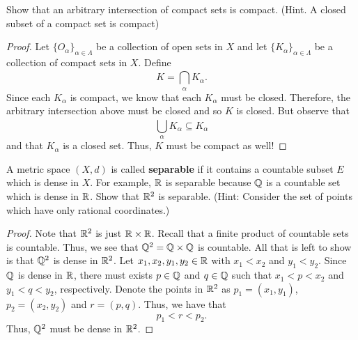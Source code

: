 \documentclass[a4paper]{article}
\begin{document}
   \begin{problem}
       Show that an arbitrary intersection of compact sets is compact. (Hint. A closed subset of a compact set is compact)
   \end{problem}
   \begin{proof}
       Let \( \{ {O}_{\alpha} \}_{\alpha \in \Lambda} \) be a collection of open sets in \( X  \) and let \( \{ {K}_{\alpha} \}_{\alpha \in \Lambda} \) be a collection of compact sets in \( X  \). Define
       \[  K = \bigcap_{  \alpha  }^{  } {K}_{\alpha}. \tag{1} \]
       Since each \( {K}_{\alpha} \) is compact, we know that each \( {K}_{\alpha} \) must be closed. Therefore, the arbitrary intersection above must be closed and so \( K  \) is closed. But observe that 
       \[  \bigcup_{ \alpha }^{  } {K}_{\alpha} \subseteq  {K}_{\alpha} \]
       and that \( K_{\alpha}  \) is a closed set. Thus, \( K  \) must be compact as well! 
   \end{proof}

    \begin{problem}
        A metric space \( (X,d) \) is called \textbf{separable} if it contains a countable subset \( E  \) which is dense in \( X  \). For example, \( \mathbb{R}  \) is separable because \( \mathbb{Q}  \) is a countable set which is dense in \( \mathbb{R}  \). Show that \( \mathbb{R}^{2}  \) is separable. (Hint: Consider the set of points which have only rational coordinates.) 
    \end{problem}
    \begin{proof}
        Note that \( \mathbb{R}^{2} \) is just \( \mathbb{R} \times \mathbb{R}  \). Recall that a finite product of countable sets is countable. Thus, we see that \( \mathbb{Q}^{2} = \mathbb{Q} \times \mathbb{Q}  \) is countable. All that is left to show is that \( \mathbb{Q}^{2} \) is dense in \( \mathbb{R}^{2} \). Let \( {x}_{1}, {x}_{2}, {y}_{1}, {y}_{2} \in \mathbb{R}  \) with \( {x}_{1} < {x}_{2} \) and \( {y}_{1} < {y}_{2} \). Since \( \mathbb{Q}  \) is dense in \( \mathbb{R}  \), there must exists \( p \in \mathbb{Q}  \) and \( q \in \mathbb{Q}  \) such that \( {x}_{1} < p < {x}_{2} \) and \( {y}_{1} < q < {y}_{2} \), respectively. Denote the points in \( \mathbb{R}^{2} \) as \( {p}_{1} = ({x}_{1}, {y}_{1}) \),  \( {p}_{2} = ({x}_{2}, {y}_{2}) \) and \( r = (p,q) \). Thus, we have that   
        \[  {p}_{1} < r < {p}_{2}.  \]
        Thus, \( \mathbb{Q}^{2}  \) must be dense in \( \mathbb{R}^{2} \).
    \end{proof}
\end{document}
